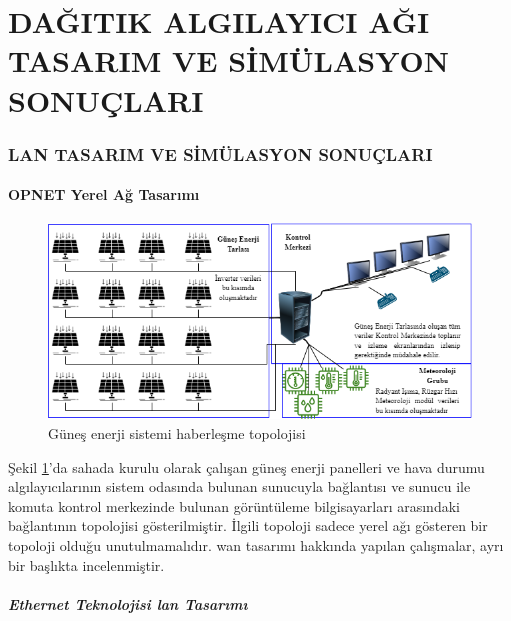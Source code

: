 
\part{DAĞITIK ALGILAYICI AĞI TASARIM VE SİMÜLASYON SONUÇLARI}


\thispagestyle{empty}
\newpage
\section{LAN TASARIM VE SİMÜLASYON SONUÇLARI}
\subsection{OPNET Yerel Ağ Tasarımı} \label{opnetges}

\begin{figure}[htbp]
\centerline{\includegraphics[width=\columnwidth]{Resim/PV-2.png}}
\caption{Güneş enerji sistemi haberleşme topolojisi}
\label{fig:4-6}
\end{figure}

Şekil \ref{fig:4-6}’da sahada kurulu olarak çalışan güneş enerji panelleri ve hava durumu algılayıcılarının sistem odasında bulunan sunucuyla bağlantısı ve sunucu ile komuta kontrol merkezinde bulunan görüntüleme bilgisayarları arasındaki bağlantının topolojisi gösterilmiştir. İlgili topoloji sadece yerel ağı gösteren bir topoloji olduğu unutulmamalıdır. \gls{wan} tasarımı hakkında yapılan çalışmalar, ayrı bir başlıkta incelenmiştir.

\subsubsection{Ethernet Teknolojisi \gls{lan} Tasarımı}\label{yerelEthernet}


